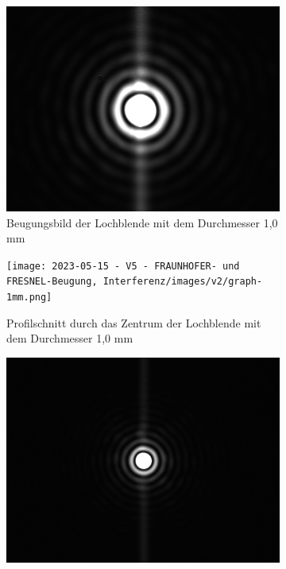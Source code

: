 \documentclass[../protokoll.tex]{subfiles}
\begin{document}
\begin{figure}[H]
    \centering
    \begin{subfigure}[t]{0.24\textwidth}
        \includegraphics[width=\textwidth]{2023-05-15 - V5 - FRAUNHOFER- und FRESNEL-Beugung, Interferenz/images/v2/1mm.png}
        \caption{Beugungsbild der Lochblende mit dem Durchmesser 1,0 mm}
        \label{fig:v2-beugung-1}
    \end{subfigure}
    \hfill
    \begin{subfigure}[t]{0.24\textwidth}
        \texttt{[image: 2023-05-15 - V5 - FRAUNHOFER- und FRESNEL-Beugung, Interferenz/images/v2/graph-1mm.png]}
        \caption{Profilschnitt durch das Zentrum der Lochblende mit dem Durchmesser 1,0 mm}
        \label{fig:v2-schnitt-1}
    \end{subfigure}
    \hfill
    \begin{subfigure}[t]{0.24\textwidth}
        \includegraphics[width=\textwidth]{2023-05-15 - V5 - FRAUNHOFER- und FRESNEL-Beugung, Interferenz/images/v2/2mm.png}

\end{subfigure}
\end{figure}
\end{document}
